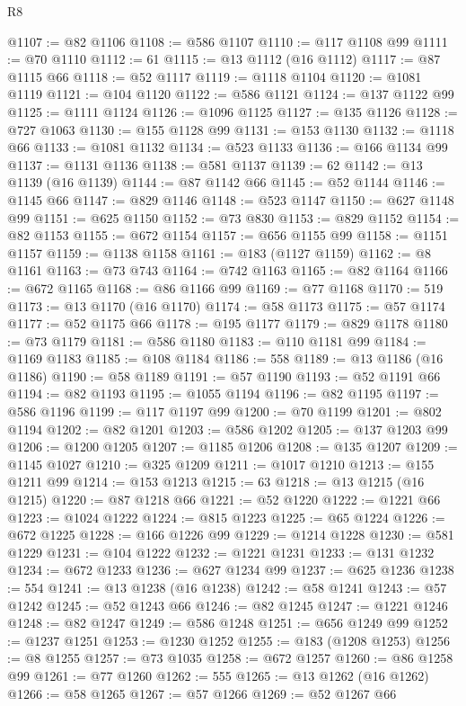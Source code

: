 \begin{lexlean}{R8}
\begin{coremodule}
@1107 := @82 @1106
@1108 := @586 @1107
@1110 := @117 @1108 @99
@1111 := @70 @1110
@1112 := 61
@1115 := @13 @1112 (@16 @1112)
@1117 := @87 @1115 @66
@1118 := @52 @1117
@1119 := @1118 @1104
@1120 := @1081 @1119
@1121 := @104 @1120
@1122 := @586 @1121
@1124 := @137 @1122 @99
@1125 := @1111 @1124
@1126 := @1096 @1125
@1127 := @135 @1126
@1128 := @727 @1063
@1130 := @155 @1128 @99
@1131 := @153 @1130
@1132 := @1118 @66
@1133 := @1081 @1132
@1134 := @523 @1133
@1136 := @166 @1134 @99
@1137 := @1131 @1136
@1138 := @581 @1137
@1139 := 62
@1142 := @13 @1139 (@16 @1139)
@1144 := @87 @1142 @66
@1145 := @52 @1144
@1146 := @1145 @66
@1147 := @829 @1146
@1148 := @523 @1147
@1150 := @627 @1148 @99
@1151 := @625 @1150
@1152 := @73 @830
@1153 := @829 @1152
@1154 := @82 @1153
@1155 := @672 @1154
@1157 := @656 @1155 @99
@1158 := @1151 @1157
@1159 := @1138 @1158
@1161 := @183 (@1127 @1159)
@1162 := @8 @1161
@1163 := @73 @743
@1164 := @742 @1163
@1165 := @82 @1164
@1166 := @672 @1165
@1168 := @86 @1166 @99
@1169 := @77 @1168
@1170 := 519
@1173 := @13 @1170 (@16 @1170)
@1174 := @58 @1173
@1175 := @57 @1174
@1177 := @52 @1175 @66
@1178 := @195 @1177
@1179 := @829 @1178
@1180 := @73 @1179
@1181 := @586 @1180
@1183 := @110 @1181 @99
@1184 := @1169 @1183
@1185 := @108 @1184
@1186 := 558
@1189 := @13 @1186 (@16 @1186)
@1190 := @58 @1189
@1191 := @57 @1190
@1193 := @52 @1191 @66
@1194 := @82 @1193
@1195 := @1055 @1194
@1196 := @82 @1195
@1197 := @586 @1196
@1199 := @117 @1197 @99
@1200 := @70 @1199
@1201 := @802 @1194
@1202 := @82 @1201
@1203 := @586 @1202
@1205 := @137 @1203 @99
@1206 := @1200 @1205
@1207 := @1185 @1206
@1208 := @135 @1207
@1209 := @1145 @1027
@1210 := @325 @1209
@1211 := @1017 @1210
@1213 := @155 @1211 @99
@1214 := @153 @1213
@1215 := 63
@1218 := @13 @1215 (@16 @1215)
@1220 := @87 @1218 @66
@1221 := @52 @1220
@1222 := @1221 @66
@1223 := @1024 @1222
@1224 := @815 @1223
@1225 := @65 @1224
@1226 := @672 @1225
@1228 := @166 @1226 @99
@1229 := @1214 @1228
@1230 := @581 @1229
@1231 := @104 @1222
@1232 := @1221 @1231
@1233 := @131 @1232
@1234 := @672 @1233
@1236 := @627 @1234 @99
@1237 := @625 @1236
@1238 := 554
@1241 := @13 @1238 (@16 @1238)
@1242 := @58 @1241
@1243 := @57 @1242
@1245 := @52 @1243 @66
@1246 := @82 @1245
@1247 := @1221 @1246
@1248 := @82 @1247
@1249 := @586 @1248
@1251 := @656 @1249 @99
@1252 := @1237 @1251
@1253 := @1230 @1252
@1255 := @183 (@1208 @1253)
@1256 := @8 @1255
@1257 := @73 @1035
@1258 := @672 @1257
@1260 := @86 @1258 @99
@1261 := @77 @1260
@1262 := 555
@1265 := @13 @1262 (@16 @1262)
@1266 := @58 @1265
@1267 := @57 @1266
@1269 := @52 @1267 @66

\end{coremodule}
\end{lexlean}
